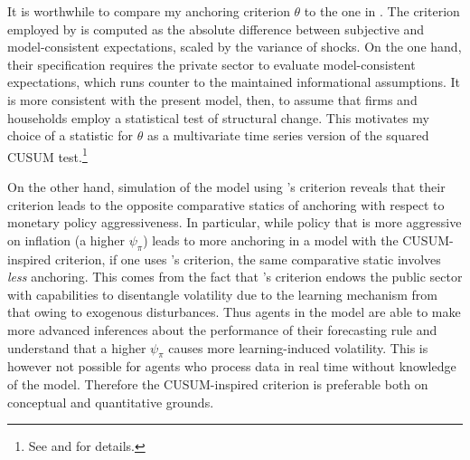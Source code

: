 \documentclass[11pt]{article}
\renewcommand{\[}{\begin{equation}}
\renewcommand{\]}{\end{equation}}
\begin{document}
It is worthwhile to compare my anchoring criterion $\theta$ to the one in \cite{carvalho2019anchored}. The criterion employed by \cite{carvalho2019anchored} is computed as the absolute difference between subjective and model-consistent expectations, scaled by the variance of shocks. On the one hand, their specification requires the private sector to evaluate model-consistent expectations, which runs counter to the maintained informational assumptions. It is more consistent with the present model, then, to assume that firms and households employ a statistical test of structural change. This motivates my choice of a statistic for $\theta$ as a multivariate time series version of the squared CUSUM test.\footnote{See \cite{brown1975techniques} and \cite{lutkepohl2013introduction} for details.} 

On the other hand, simulation of the model using \cite{carvalho2019anchored}'s criterion reveals that their criterion leads to the opposite comparative statics of anchoring with respect to monetary policy aggressiveness. In particular, while policy that is more aggressive on inflation (a higher $\psi_{\pi}$) leads to more anchoring in a model with the CUSUM-inspired criterion, if one uses \cite{carvalho2019anchored}'s criterion, the same comparative static involves \emph{less} anchoring. This comes from the fact that \cite{carvalho2019anchored}'s criterion endows the public sector with capabilities to disentangle volatility due to the learning mechanism from that owing to exogenous disturbances. Thus agents in the \cite{carvalho2019anchored} model are able to make more advanced inferences about the performance of their forecasting rule and understand that a higher $\psi_{\pi}$ causes more learning-induced volatility. This is however not possible for agents who process data in real time without knowledge of the model. Therefore the CUSUM-inspired criterion is preferable both on conceptual and quantitative grounds.
\end{document}
